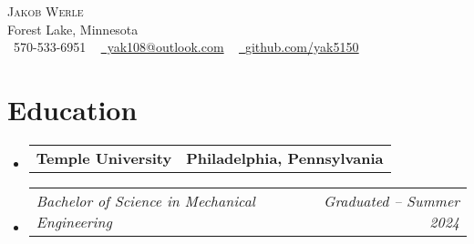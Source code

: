\documentclass[letterpaper,11pt]{article}
\makeatletter
\newcommand{\company}[2]{
  \vspace{-2pt}\item
    \begin{tabular*}{1.0\textwidth}[t]{l@{\extracolsep{\fill}}r}
      \textbf{#1} & \textbf{\small #2} \\
    \end{tabular*}\vspace{-18pt}
}
\newcommand{\role}[2]{
  \vspace{-5pt}\item
    \begin{tabular*}{1.0\textwidth}[t]{l@{\extracolsep{\fill}}r}
      \textit{\small#1} & \textit{\small #2} \\
    \end{tabular*}\vspace{-7pt}
}
\newcommand{\companyListStart}{\begin{itemize}[leftmargin=0.0in, label={}]}
\newcommand{\companyListEnd}{\end{itemize}}
\makeatother
\begin{document}

\begin{center}
    {\Huge \scshape Jakob Werle} \\ \vspace{1pt}
    Forest Lake, Minnesota \\ \vspace{1pt}
    \small \raisebox{-0.1\height}\faPhone\ 570-533-6951 ~ \href{mailto:yak108@outlook.com}{\raisebox{-0.2\height}\faEnvelope\ yak108@outlook.com} ~ 
    \href{https://github.com/yak5150}{\raisebox{-0.2\height}\faGithub\ \underline{github.com/yak5150}}
    \vspace{-8pt}
\end{center}

\section{Education}
  \companyListStart
    \company{Temple University}{Philadelphia, Pennsylvania}
      \role{Bachelor of Science in Mechanical Engineering}{Graduated -- Summer 2024}
  \companyListEnd

\end{document}
